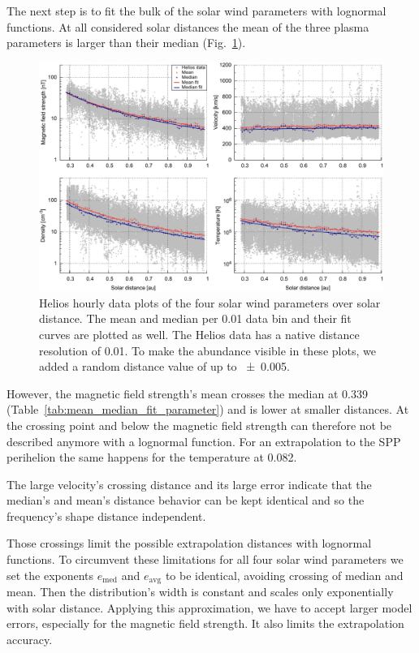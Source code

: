 The next step is to fit the bulk of the solar wind parameters with lognormal functions. At all considered solar distances the mean of the three plasma parameters is larger than their median (Fig.~\ref{fig:radial_fit_4_thesis_light_skip_pdfcairo_plot}).
\begin{figure}
	\includegraphics[width=18cm]{figures/radial_fit_4_thesis_light_skip_pdfcairo_plot.pdf}
	\caption{Helios hourly data plots of the four solar wind parameters over solar distance. The mean and median per \SI{0.01}{\au} data bin and their fit curves are plotted as well. The Helios data has a native distance resolution of \SI{0.01}{\au}. To make the abundance visible in these plots, we added a random distance value of up to \SI{+-0.005}{\au}.}
	\label{fig:radial_fit_4_thesis_light_skip_pdfcairo_plot}
\end{figure}
However, the magnetic field strength's mean crosses the median at \SI{0.339}{\au} (Table~\ref{tab:mean_median_fit_parameter}) and is lower at smaller distances. At the crossing point and below the magnetic field strength can therefore not be described anymore with a lognormal function. For an extrapolation to the SPP perihelion the same happens for the temperature at \SI{0.082}{\au}.

The large velocity's crossing distance and its large error indicate that the median's and mean's distance behavior can be kept identical and so the frequency's shape distance independent.

Those crossings limit the possible extrapolation distances with lognormal functions. To circumvent these limitations for all four solar wind parameters we set the exponents $e_\text{med}$ and $e_\text{avg}$ to be identical, avoiding crossing of median and mean. Then the distribution's width is constant and scales only exponentially with solar distance. Applying this approximation, we have to accept larger model errors, especially for the magnetic field strength. It also limits the extrapolation accuracy.

